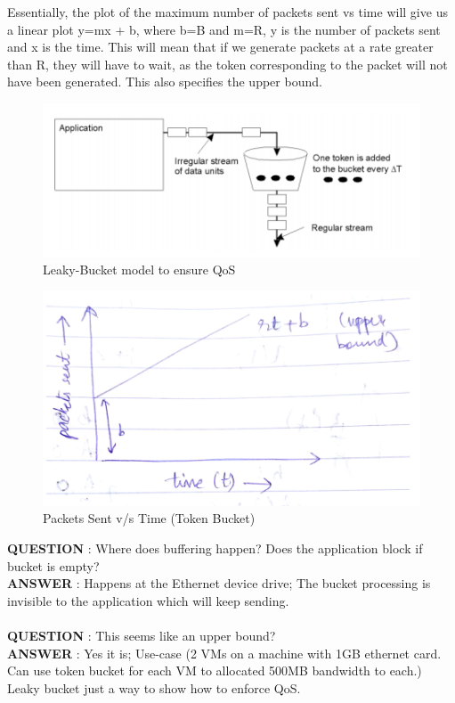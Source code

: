 \documentclass[twoside]{article}
\begin{document}
Essentially, the plot of the maximum number of packets sent vs time will give us a linear plot y=mx + b, where b=B and m=R, y is the number of packets sent and x is the time. This will mean that if we generate packets at a rate greater than R, they will have to wait, as the token corresponding to the packet will not have been generated. This also specifies the upper bound.


\begin{figure}[h!]
\includegraphics[scale=0.5]{leaky.png}
\centering
\caption{Leaky-Bucket model to ensure QoS}
\end{figure}

\begin{figure}[h!]
\includegraphics[scale=0.5]{leaky_graph.png}
\centering
\caption{Packets Sent v/s Time (Token Bucket)}
\end{figure}


\textbf{QUESTION} : Where does buffering happen? Does the application block if bucket is empty?\\
\textbf{ANSWER} : Happens at the Ethernet device drive; The bucket processing is invisible to the application which will keep sending.\\\\ 
\textbf{QUESTION} : This seems like an upper bound?\\
\textbf{ANSWER} : Yes it is; Use-case (2 VMs on a machine with 1GB ethernet card. Can use token bucket for each VM to allocated 500MB bandwidth to each.) Leaky bucket just a way to show how to enforce QoS. 
\end{document}
